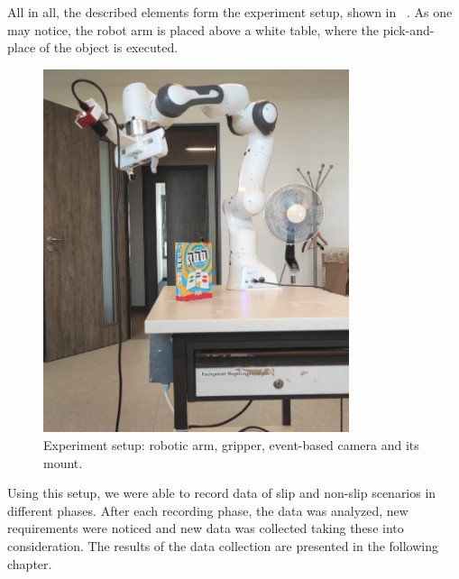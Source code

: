 All in all, the described elements form the experiment setup, shown in ~. As one may notice, the robot arm is placed above a white table, where the pick-and-place of the object is executed.

\begin{figure}[H]
    \centering
    \includegraphics[width=0.8\textwidth]{resources/images/setup}
    \caption{Experiment setup: robotic arm, gripper, event-based camera and its mount.}\label{fig:setup}
\end{figure}

Using this setup, we were able to record data of slip and non-slip scenarios in different phases. After each recording phase, the data was analyzed, new requirements were noticed and new data was collected taking these into consideration. The results of the data collection are presented in the following chapter.
